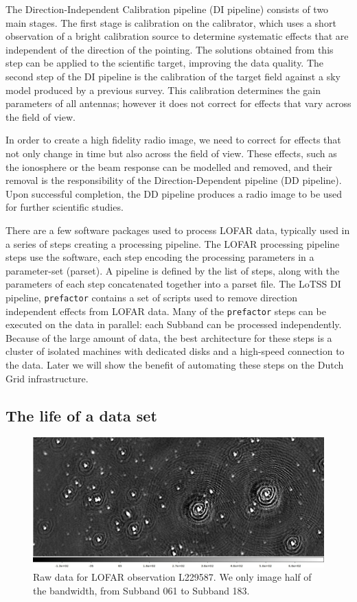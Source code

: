 The Direction-Independent Calibration pipeline (DI pipeline) consists of two main stages. The first stage is calibration on the calibrator, which uses a short observation of a bright calibration source to determine systematic effects that are independent of the direction of the pointing. The solutions obtained from this step can be applied to the scientific target, improving the data quality. The second step of the DI pipeline is the calibration of the target field against a sky model produced by a previous survey. This calibration determines the gain parameters of all antennas; however it does not correct for effects that vary across the field of view. 
 
In order to create a high fidelity radio image, we need to correct for effects that not only change in time but also across the field of view. These effects, such as the ionosphere or the beam response can be modelled and removed, and their removal is the responsibility of the Direction-Dependent pipeline (DD pipeline). Upon successful completion, the DD pipeline produces a radio image to be used for further scientific studies.

There are a few software packages used to process LOFAR data, typically used in a series of steps creating a processing pipeline. The LOFAR processing pipeline steps use the software, each step encoding the processing parameters in a parameter-set (parset). A pipeline is defined by the list of steps, along with the parameters of each step concatenated together into a parset file. The LoTSS DI pipeline, \texttt{prefactor} contains a set of scripts used to remove direction independent effects from LOFAR data. Many of the \texttt{prefactor} steps can be executed on the data in parallel: each Subband can be processed independently. Because of the large amount of data, the best architecture for these steps is a cluster of isolated machines with dedicated disks and a high-speed connection to the data. Later we will show the benefit of automating these steps on the Dutch Grid infrastructure. 

\subsection{The life of a data set}

\begin{figure}[!htb]
    \centering
    \includegraphics[width=.8\linewidth]{background/figures/raw_image1.jpeg}
    \caption[Image of the raw data]{Raw data for LOFAR observation L229587. We only image half of the bandwidth, from Subband 061 to Subband 183.  }
    \label{fig:L229587_raw}
\end{figure}


